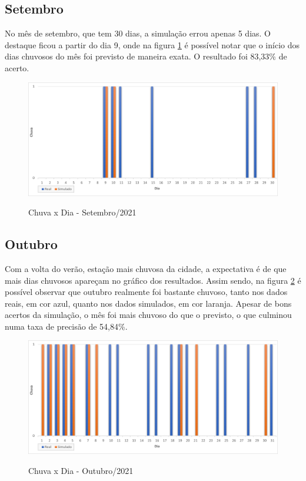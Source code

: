\subsection{Setembro}
No mês de setembro, que tem 30 dias, a simulação errou apenas 5 dias. O destaque ficou a partir do dia 9, onde na figura \ref{f.rset} é possível notar que o início dos dias chuvosos do mês foi previsto de maneira exata. O resultado foi 83,33\% de acerto.
\begin{figure}[H]
	\caption{\small Chuva x Dia - Setembro/2021}
	\centering
	\includegraphics[width=\textwidth]{figs/set.png}
	\label{f.rset}
\end{figure}

\subsection{Outubro}
Com a volta do verão, estação mais chuvosa da cidade, a expectativa é de que mais dias chuvosos apareçam no gráfico dos resultados. Assim sendo, na figura \ref{f.rout} é possível observar que outubro realmente foi bastante chuvoso, tanto nos dados reais, em cor azul, quanto nos dados simulados, em cor laranja. Apesar de bons acertos da simulação, o mês foi mais chuvoso do que o previsto, o que culminou numa taxa de precisão de 54,84\%.
\begin{figure}[H]
	\caption{\small Chuva x Dia - Outubro/2021}
	\centering
	\includegraphics[width=\textwidth]{figs/out.png}
	\label{f.rout}
\end{figure}

